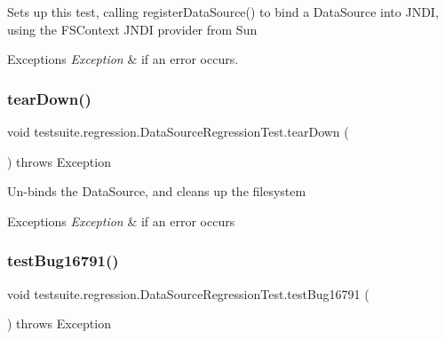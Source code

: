 Sets up this test, calling register\+Data\+Source() to bind a Data\+Source into J\+N\+DI, using the F\+S\+Context J\+N\+DI provider from Sun


\begin{DoxyExceptions}{Exceptions}
{\em Exception} & if an error occurs. \\
\hline
\end{DoxyExceptions}
\mbox{\label{classtestsuite_1_1regression_1_1_data_source_regression_test_a8832a43271bfaaf86c320113cf001ecd}} 
\subsubsection{\texorpdfstring{tear\+Down()}{tearDown()}}
{\footnotesize\ttfamily void testsuite.\+regression.\+Data\+Source\+Regression\+Test.\+tear\+Down (\begin{DoxyParamCaption}{ }\end{DoxyParamCaption}) throws Exception}

Un-\/binds the Data\+Source, and cleans up the filesystem


\begin{DoxyExceptions}{Exceptions}
{\em Exception} & if an error occurs \\
\hline
\end{DoxyExceptions}
\mbox{\label{classtestsuite_1_1regression_1_1_data_source_regression_test_af69d51f59966174507009b456bcc4ef3}} 
\subsubsection{\texorpdfstring{test\+Bug16791()}{testBug16791()}}
{\footnotesize\ttfamily void testsuite.\+regression.\+Data\+Source\+Regression\+Test.\+test\+Bug16791 (\begin{DoxyParamCaption}{ }\end{DoxyParamCaption}) throws Exception}

